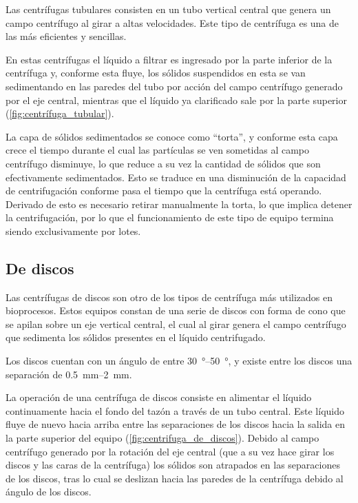 \documentclass{AsignaturaResumen}
\begin{document}
Las centrífugas tubulares consisten en un tubo vertical central que genera un campo centrífugo al girar a altas velocidades. Este tipo de centrífuga es una de las más eficientes y sencillas. 

En estas centrífugas el líquido a filtrar es ingresado por la parte inferior de la centrífuga y, conforme esta fluye, los sólidos suspendidos en esta se van sedimentando en las paredes del tubo por acción del campo centrífugo generado por el eje central, mientras que el líquido ya clarificado sale por la parte superior (\autoref{fig:centrífuga_tubular}).


La capa de sólidos sedimentados se conoce como ``torta'', y conforme esta capa crece el tiempo durante el cual las partículas se ven sometidas al campo centrífugo disminuye, lo que reduce a su vez la cantidad de sólidos que son efectivamente sedimentados. Esto se traduce en una disminución de la capacidad de centrifugación conforme pasa el tiempo que la centrífuga está operando. Derivado de esto es necesario retirar manualmente la torta, lo que implica detener la centrifugación, por lo que el funcionamiento de este tipo de equipo termina siendo exclusivamente por lotes.



\subsection{De discos}

Las centrífugas de discos son otro de los tipos de centrífuga más utilizados en bioprocesos. Estos equipos constan de una serie de discos con forma de cono que se apilan sobre un eje vertical central, el cual al girar genera el campo centrífugo que sedimenta los sólidos presentes en el líquido centrifugado.

Los discos cuentan con un ángulo de entre \qtyrange{30}{50}{\degree}, y existe entre los discos una separación de \qtyrange{0.5}{2}{\milli\m}. 

La operación de una centrífuga de discos consiste en alimentar el líquido continuamente hacia el fondo del tazón a través de un tubo central. Este líquido fluye de nuevo hacia arriba entre las separaciones de los discos hacia la salida en la parte superior del equipo (\autoref{fig:centrifuga_de_discos}). Debido al campo centrífugo generado por la rotación del eje central (que a su vez hace girar los discos y las caras de la centrífuga) los sólidos son atrapados en las separaciones de los discos, tras lo cual se deslizan hacia las paredes de la centrífuga debido al ángulo de los discos.
\end{document}
